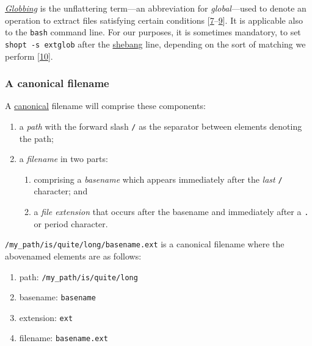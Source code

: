 \documentclass[
  a4paper,
]{article}
\providecommand{\tightlist}{%
  \setlength{\itemsep}{0pt}\setlength{\parskip}{0pt}}
\begin{document}
\href{https://en.wikipedia.org/w/index.php?title=Glob_(programming)\&oldid=1133836865}{\emph{Globbing}}
is the unflattering term---an abbreviation for \emph{global}---used to
denote an operation to extract files satisfying certain conditions
{[}\protect\hyperlink{ref-glob2023}{7}--\protect\hyperlink{ref-globhistory}{9}{]}.
It is applicable also to the \texttt{bash} command line. For our
purposes, it is sometimes mandatory, to set \texttt{shopt\ -s\ extglob}
after the \href{https://en.wikipedia.org/wiki/Shebang_(Unix)}{shebang}
line, depending on the sort of matching we perform
{[}\protect\hyperlink{ref-extglob}{10}{]}.

\hypertarget{a-canonical-filename}{%
\subsubsection{A canonical filename}\label{a-canonical-filename}}

A \href{https://www.thefreedictionary.com/canonical}{canonical} filename
will comprise these components:

\begin{enumerate}
\tightlist
\item
  a \emph{path} with the forward slash \texttt{/} as the separator
  between elements denoting the path;
\item
  a \emph{filename} in two parts:

  \begin{enumerate}
  \def\labelenumii{(\alph{enumii})}
  \tightlist
  \item
    comprising a \emph{basename} which appears immediately after the
    \emph{last} \texttt{/} character; and
  \item
    a \emph{file extension} that occurs after the basename and
    immediately after a \texttt{.} or period character.
  \end{enumerate}
\end{enumerate}

\texttt{/my\_path/is/quite/long/basename.ext} is a canonical filename
where the abovenamed elements are as follows:

\begin{enumerate}
\tightlist
\item
  path: \texttt{/my\_path/is/quite/long}
\item
  basename: \texttt{basename}
\item
  extension: \texttt{ext}
\item
  filename: \texttt{basename.ext}
\end{enumerate}
\end{document}
